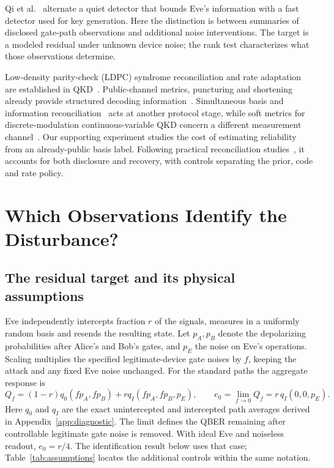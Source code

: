 \documentclass[manuscript,screen,review,anonymous]{acmart}
\begin{document}
Qi et al.~\cite{qi2007dualdet} alternate a quiet detector that bounds Eve's
information with a fast detector used for key generation. Here the distinction
is between summaries of disclosed gate-path observations and additional
noise interventions. The target is a modeled residual under unknown device
noise; the rank test characterizes what those observations determine.

Low-density parity-check (LDPC) syndrome reconciliation and rate adaptation are established in
QKD~\cite{elkouss2009,elkouss2011,blind2012,martinez2013}. Public-channel
metrics, puncturing and shortening already provide structured decoding
information~\cite{mesiti2010,blind2012}. Simultaneous basis and information
reconciliation~\cite{martinezmateo2024} acts at another protocol stage, while
soft metrics for discrete-modulation continuous-variable QKD concern a different
measurement channel~\cite{origlia2026}. Our supporting experiment studies the
cost of estimating reliability from an already-public basis label.
Following practical reconciliation studies~\cite{borisov2023,treeviriyanupab2024},
it accounts for both disclosure and recovery, with controls separating the
prior, code and rate policy.

\section{Which Observations Identify the Disturbance?}
\label{sec:diagnostics}
\subsection{The residual target and its physical assumptions}
Eve independently intercepts fraction $r$ of the signals, measures in a
uniformly random basis and resends the resulting state. Let $p_A,p_B$ denote
the depolarizing probabilities after Alice's and Bob's gates, and $p_E$ the
noise on Eve's operations. Scaling multiplies the specified legitimate-device
gate noises by $f$, keeping the attack and any fixed Eve noise unchanged.
For the standard paths the aggregate response is
\begin{equation}
 Q_f=(1-r)q_0(fp_A,fp_B)+r q_I(fp_A,fp_B,p_E),\qquad
 e_0=\lim_{f\to 0}Q_f=r\,q_I(0,0,p_E).
 \label{eq:separatedresponse}
\end{equation}
Here $q_0$ and $q_I$ are the exact unintercepted and intercepted path averages
derived in Appendix~\ref{app:diagnostic}. The limit defines the QBER remaining
after controllable legitimate gate noise is removed. With ideal Eve and
noiseless readout, $e_0=r/4$. The identification result below uses that case;
Table~\ref{tab:assumptions} locates the additional controls within the same notation.
\end{document}
